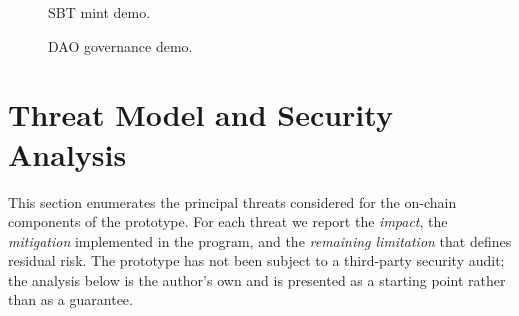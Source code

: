 \begin{figure}[H]
    \centering
    \caption{SBT mint demo.}
    \label{fig:demo_mint_sbt}
\end{figure}

\begin{figure}[H]
    \centering
    \caption{DAO governance demo.}
    \label{fig:demo_dao_vote}
\end{figure}

\section{Threat Model and Security Analysis}
\label{section:4.6}

This section enumerates the principal threats considered for the on-chain components of the prototype. For each threat we report the \emph{impact}, the \emph{mitigation} implemented in the program, and the \emph{remaining limitation} that defines residual risk. The prototype has not been subject to a third-party security audit; the analysis below is the author's own and is presented as a starting point rather than as a guarantee.

